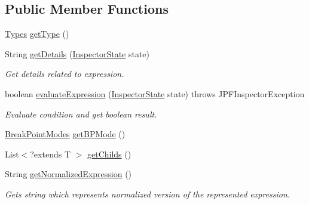 \subsection*{Public Member Functions}
\begin{DoxyCompactItemize}
\item 
\hyperlink{enumgov_1_1nasa_1_1jpf_1_1inspector_1_1server_1_1expression_1_1_types}{Types} \hyperlink{classgov_1_1nasa_1_1jpf_1_1inspector_1_1server_1_1expression_1_1_expression_boolean_aed010ff8683eb1e8621e226703133457}{get\+Type} ()
\item 
String \hyperlink{classgov_1_1nasa_1_1jpf_1_1inspector_1_1server_1_1expression_1_1_expression_boolean_a43423e204404f24bf7862de938598eb7}{get\+Details} (\hyperlink{interfacegov_1_1nasa_1_1jpf_1_1inspector_1_1server_1_1expression_1_1_inspector_state}{Inspector\+State} state)
\begin{DoxyCompactList}\small\item\em Get details related to expression. \end{DoxyCompactList}\item 
boolean \hyperlink{interfacegov_1_1nasa_1_1jpf_1_1inspector_1_1server_1_1expression_1_1_expression_boolean_interface_adc81f58d2517d5ccb9ace7f5d8b8211f}{evaluate\+Expression} (\hyperlink{interfacegov_1_1nasa_1_1jpf_1_1inspector_1_1server_1_1expression_1_1_inspector_state}{Inspector\+State} state)  throws J\+P\+F\+Inspector\+Exception
\begin{DoxyCompactList}\small\item\em Evaluate condition and get boolean result. \end{DoxyCompactList}\item 
\hyperlink{enumgov_1_1nasa_1_1jpf_1_1inspector_1_1server_1_1breakpoints_1_1_break_point_modes}{Break\+Point\+Modes} \hyperlink{interfacegov_1_1nasa_1_1jpf_1_1inspector_1_1server_1_1expression_1_1_expression_boolean_interface_a970737c885b2bb8abfbd5729275855ac}{get\+B\+P\+Mode} ()
\item 
List$<$?extends T $>$ \hyperlink{interfacegov_1_1nasa_1_1jpf_1_1inspector_1_1server_1_1expression_1_1_expression_node_interface_aaeec5305da52fbad211a7abf22b0a854}{get\+Childs} ()
\item 
String \hyperlink{interfacegov_1_1nasa_1_1jpf_1_1inspector_1_1server_1_1expression_1_1_expression_node_interface_ae5387d8da0126c1256a786d54b9bd7ce}{get\+Normalized\+Expression} ()
\begin{DoxyCompactList}\small\item\em Gets string which represents normalized version of the represented expression. \end{DoxyCompactList}\end{DoxyCompactItemize}


